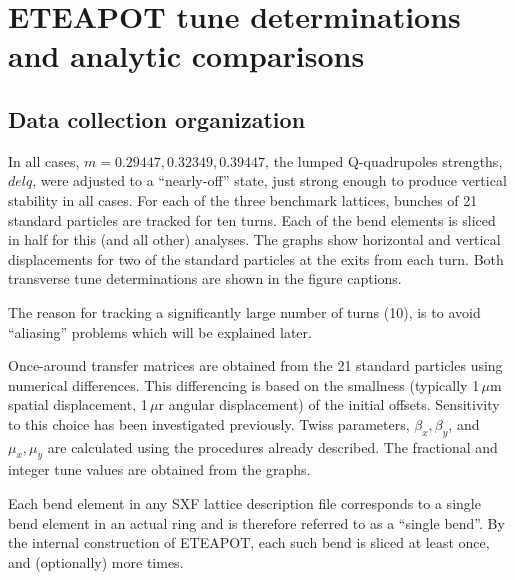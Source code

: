 \documentclass[12pt]{article}
\begin{document}
\section{ETEAPOT tune determinations and analytic comparisons}
\subsection{Data collection organization}
In all cases, $m=0.29447, 0.32349, 0.39447$, the lumped Q-quadrupoles strengths, $delq$, were adjusted
to a ``nearly-off'' state, just strong enough to produce vertical stability in all cases.
For each of the three benchmark lattices, bunches of 21 standard particles are 
tracked for ten turns. Each of the bend elements is sliced in half for this (and all other) analyses. 
The graphs show horizontal and vertical displacements for two of the standard particles at the exits from 
each turn.  Both transverse tune determinations are shown in the figure captions. 

The reason for tracking a significantly large number of turns (10), is to avoid ``aliasing'' problems which will
be explained later.

Once-around transfer matrices are obtained from the 21 standard particles using numerical differences. 
This differencing is based on the smallness (typically 1\,$\mu$m spatial displacement, 1\,$\mu$r 
angular displacement) of the initial offsets.  Sensitivity to this choice has been investigated previously.
Twiss parameters, $\beta_x, \beta_y$, and  $\mu_x, \mu_y$ are calculated using the procedures already 
described. The fractional and integer tune values are obtained from the graphs.

Each bend element in any SXF lattice description file corresponds to a single bend element in
an actual ring and is therefore referred to as a ``single bend''. By the internal construction of ETEAPOT, 
each such bend is sliced at least once, and (optionally) more times. 
\end{document}
